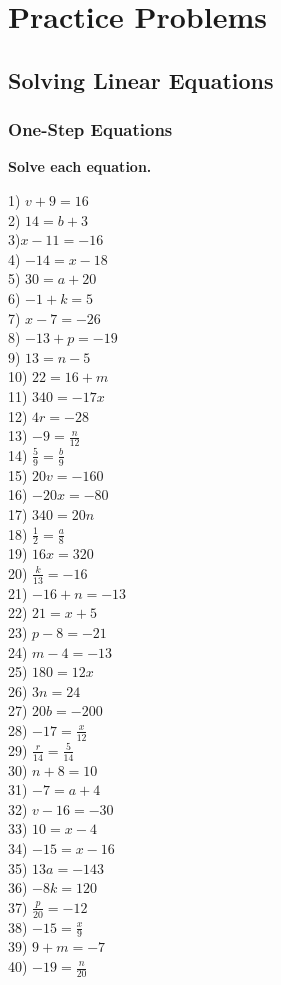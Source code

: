 \documentclass[12pt]{book}
\theoremstyle{definition}
\begin{document}
\section{Practice Problems}
\subsection*{Solving Linear Equations}
\subsubsection*{One-Step Equations}
{\bf Solve each equation.}
\begin{multicols}{4}
  1) $v + 9 = 16$\\
  2) $14 = b + 3$\\
  3)$x - 11 = - 16$\\
  4) $- 14 = x - 18$\\
  5) $30 = a + 20$\\
  6) $- 1 + k = 5$\\
  7) $x - 7 = - 26$\\
  8) $- 13 + p = - 19$\\
  9) $13 = n - 5$\\
  10) $22 = 16 + m$\\
  11) $340 = - 17 x$\\
  12) $4 r = - 28$\\
  13) $- 9 = \frac{n}{12}$\\
  14) $\frac{5}{9} = \frac{b}{9}$\\
  15) $20 v = - 160$\\
  16) $- 20 x = - 80$\\
  17) $340 = 20 n$\\
  18) $\frac{1}{2} = \frac{a}{8}$\\
  19) $16 x = 320$\\
  20) $\frac{k}{13} = - 16$\\
  21) $- 16 + n = - 13$\\
  22) $21 = x + 5$\\
  23) $p - 8 = - 21$\\
  24) $m - 4 = - 13$\\
  25) $180 = 12 x$\\
  26) $3 n = 24$\\
  27) $20 b = - 200$\\
  28) $- 17 = \frac{x}{12}$\\
  29) $\frac{r}{14} = \frac{5}{14}$\\
  30) $n + 8 = 10$\\
  31) $- 7 = a + 4$\\
  32) $v - 16 = - 30$\\
  33) $10 = x - 4$\\
  34) $- 15 = x - 16$\\
  35) $13 a = - 143$\\
  36) $- 8 k = 120$\\
  37) $\frac{p}{20} = - 12$\\
  38) $- 15 = \frac{x}{9}$\\
  39) $9 + m = - 7$\\
  40) $- 19 = \frac{n}{20}$
\end{multicols}
\end{document}
